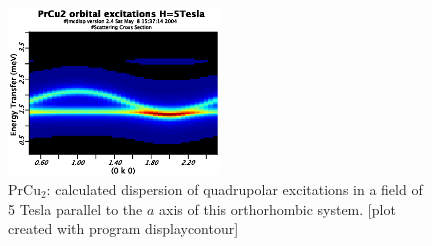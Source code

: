 \begin{figure}[hb]%
\begin{center}\leavevmode
\includegraphics[angle=0, width=0.5\textwidth]{figsrc/prcu2_0k0_5T.eps}
\end{center}
\caption{PrCu$_2$: calculated dispersion of quadrupolar excitations in a field of 5 Tesla parallel to the $a$ axis %
of this orthorhombic system.
[plot created with program {\prg displaycontour}]}
\label{qintensity}
\end{figure}
